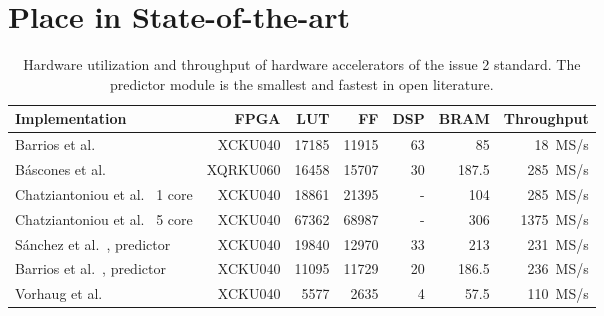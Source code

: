 \section{Place in State-of-the-art}

\begin{table}[ht]
	\caption{Hardware utilization and throughput of hardware accelerators of the issue 2 standard. The predictor module is the smallest and fastest in open literature.}
	\label{tab:throughput-this-work}
	\centering
	\begin{tabular}{l r r r r r r}
		\hline
		\textbf{Implementation}                                                                                      & \textbf{FPGA} & \textbf{LUT} & \textbf{FF} & \textbf{DSP} & \textbf{BRAM} & \textbf{Throughput} \\
		\hline
		Barrios et al.\ \cite{barriosHardwareImplementationCCSDS2021}                                                & XCKU040       & 17185        & 11915       & 63           & 85            & 18~MS/s             \\
		B\'ascones et al.\ \cite{basconesRealTimeFPGAImplementation2022}                                             & XQRKU060      & 16458        & 15707       & 30           & 187.5         & 285~MS/s            \\
		Chatziantoniou et al.\ \cite{chatziantoniouScalableDataRateNearLossless2022a} 1 core                         & XCKU040       & 18861        & 21395       & -            & 104           & 285~MS/s            \\
		Chatziantoniou et al.\ \cite{chatziantoniouScalableDataRateNearLossless2022a} 5 core                         & XCKU040       & 67362        & 68987       & -            & 306           & 1375~MS/s           \\
		S\'anchez et al.\ \cite{sanchezReducingDataDependencies2022, barriosRemovingDataDependencies2024}, predictor & XCKU040       & 19840        & 12970       & 33           & 213           & 231~MS/s            \\
		Barrios et al.\ \cite{barriosRemovingDataDependencies2024}, predictor                                        & XCKU040       & 11095        & 11729       & 20           & 186.5         & 236~MS/s            \\
		Vorhaug et al.\ \cite{vorhaugHyperspectralImageCompression2024}                                              & XCKU040       & 5577         & 2635        & 4            & 57.5          & 110~MS/s            \\

\end{tabular}
\end{table}

